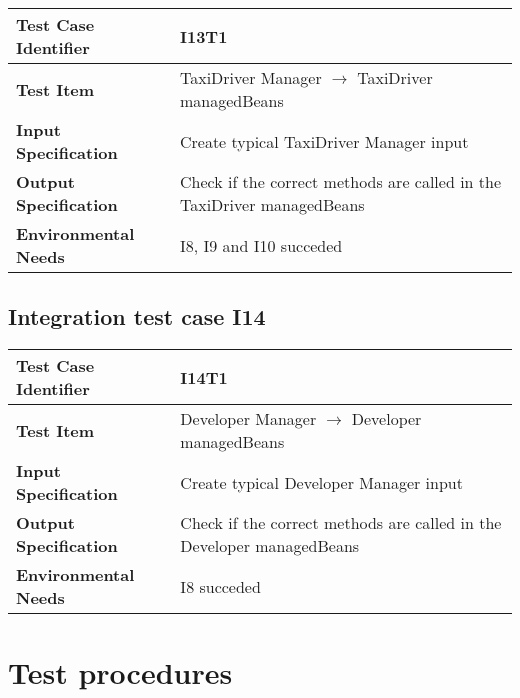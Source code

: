 \begin{table}[!htbp]
\begin{center}
\begin{tabular}[t]{p{}p{}}

\hline
\textbf{Test Case Identifier} & I13T1 \\
\hline
\textbf{Test Item} & TaxiDriver Manager $\rightarrow$ TaxiDriver managedBeans \\
\hline
\textbf{Input Specification} & Create typical TaxiDriver Manager input  \\
\hline
\textbf{Output Specification} & Check if the correct methods are called in the TaxiDriver managedBeans \\
\hline
\textbf{Environmental Needs} & I8, I9 and I10 succeded \\
\hline

\end{tabular}
\end{center}
\end{table}

\subsection{Integration test case I14}

\begin{table}[!htbp]
\begin{center}
\begin{tabular}[t]{p{}p{}}

\hline
\textbf{Test Case Identifier} & I14T1 \\
\hline
\textbf{Test Item} & Developer Manager $\rightarrow$ Developer managedBeans \\
\hline
\textbf{Input Specification} & Create typical Developer Manager input  \\
\hline
\textbf{Output Specification} & Check if the correct methods are called in the Developer managedBeans \\
\hline
\textbf{Environmental Needs} & I8 succeded \\
\hline

\end{tabular}
\end{center}
\end{table}
\clearpage

\section{Test procedures}

